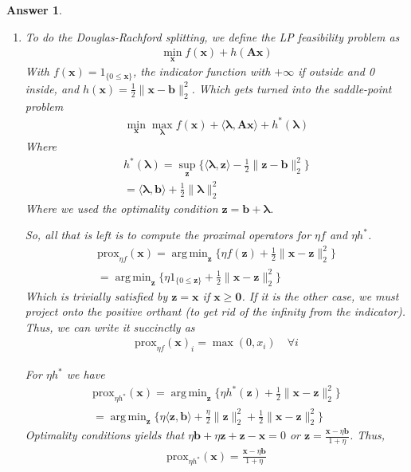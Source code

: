 \documentclass[12pt]{article}
\DeclareMathOperator*{\argmin}{arg\,min}
\theoremstyle{colon}
\newtheorem*{answer}{Answer}
\begin{document}
\begin{answer}
	\
	\begin{enumerate}[label=\alph*)]
		\item To do the Douglas-Rachford splitting, we define the LP feasibility problem as
			\begin{gather*}
				\min_{\bm{x}} f(\bm{x}) + h(\bm{A} \bm{x})
			\end{gather*}
			With $f(\bm{x}) = 1_{\{0 \leq \bm{x}\}}$, the indicator function with $+\infty$ if outside and 0 inside, and $h(\bm{x}) = \frac{1}{2} \lVert \bm{x} - \bm{b} \rVert_2^2$. Which gets turned into the saddle-point problem
			\begin{gather*}
				\min_{\bm{x}} \max_{\bm{\lambda}} f(\bm{x}) + \langle \bm{\lambda}, \bm{A}\bm{x} \rangle + h^*(\bm{\lambda})
			\end{gather*}
			Where
			\begin{gather*}
				h^*(\bm{\lambda}) = \sup_{\bm{z}} \{ \langle \bm{\lambda}, \bm{z} \rangle - \frac{1}{2} \lVert \bm{z} - \bm{b} \rVert_2^2 \} \\
				= \langle \bm{\lambda}, \bm{b} \rangle + \frac{1}{2} \lVert \bm{\lambda} \rVert_2^2
			\end{gather*}
			Where we used the optimality condition $\bm{z} = \bm{b} + \bm{\lambda}$.

			So, all that is left is to compute the proximal operators for $\eta f$ and $\eta h^*$.
			\begin{gather*}
				\text{prox}_{\eta f}(\bm{x}) = \argmin_{\bm{z}} \{ \eta f(\bm{z}) + \frac{1}{2} \lVert \bm{x} - \bm{z} \rVert_2^2 \} \\
				= \argmin_{\bm{z}} \{ \eta 1_{\{0 \leq \bm{z}\}} + \frac{1}{2} \lVert \bm{x} - \bm{z} \rVert_2^2 \}
			\end{gather*}
			Which is trivially satisfied by $\bm{z} = \bm{x}$ if $\bm{x} \geq \bm{0}$. If it is the other case, we must project onto the positive orthant (to get rid of the infinity from the indicator). Thus, we can write it succinctly as
			\begin{gather*}
				\text{prox}_{\eta f}(\bm{x})_i = \max (0, x_i) \quad \forall i
			\end{gather*}

			For $\eta h^*$ we have
			\begin{gather*}
				\text{prox}_{\eta h^*}(\bm{x}) = \argmin_{\bm{z}} \{ \eta h^*(\bm{z}) + \frac{1}{2} \lVert \bm{x} - \bm{z} \rVert_2^2 \} \\
				= \argmin_{\bm{z}} \{ \eta \langle \bm{z}, \bm{b} \rangle + \frac{\eta}{2} \lVert \bm{z} \rVert_2^2 + \frac{1}{2} \lVert \bm{x} - \bm{z} \rVert_2^2 \}
			\end{gather*}
			Optimality conditions yields that $\eta \bm{b} + \eta \bm{z} + \bm{z} - \bm{x} = 0$ or $\bm{z} = \frac{\bm{x} - \eta \bm{b}}{1+\eta}$. Thus,
			\begin{gather*}
				\text{prox}_{\eta h^*}(\bm{x}) = \frac{\bm{x} - \eta \bm{b}}{1+\eta}
			\end{gather*}


\end{enumerate}
\end{answer}
\end{document}
